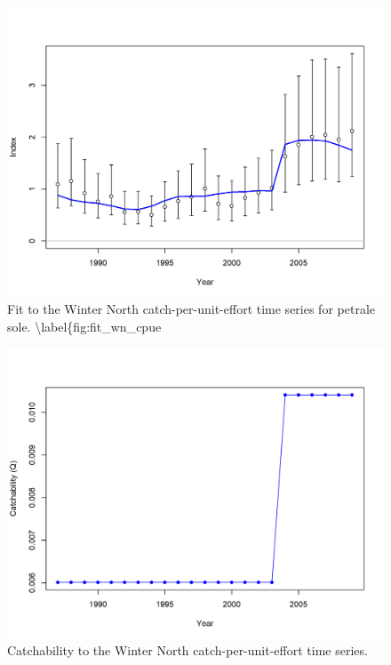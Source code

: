 \documentclass[12pt,]{article}
\begin{document}
\begin{figure}
\centering
\includegraphics{r4ss/plots_mod1/index2_cpuefit_Winter (N).png}
\caption{Fit to the Winter North catch-per-unit-effort time series for
petrale sole. \textbackslash{}label\{fig:fit\_wn\_cpue}
\end{figure}

\FloatBarrier

\begin{figure}
\centering
\includegraphics{r4ss/plots_mod1/index7_timevaryingQ_Winter (N).png}
\caption{Catchability to the Winter North catch-per-unit-effort time
series. \label{fig:q_north}}
\end{figure}
\end{document}
